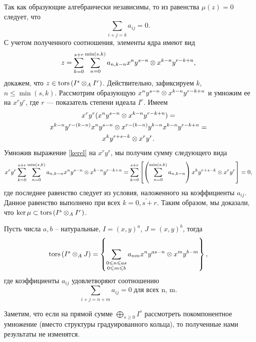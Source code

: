 \begin{Proof}
        Так как образующие алгебраически независимы, то из равенства $\mu(z) = 0$ следует, что
        \begin{equation*}
            \sum_{i + j = k} a_{ij} = 0.
        \end{equation*}
        С учетом полученного соотношения, элементы ядра имеют вид
        \begin{equation} \label{kerel}
            z = \sum_{k=0}^{s + r} \sum_{n = 0}^{\min(s, k)} a_{n,k-n}x^ny^{s - n} \otimes x^{k - n}y^{r - k + n},
        \end{equation}
        докажем, что $z \in \textup{tors}\left(I^s \otimes_A I^r\right)$. Действительно, зафиксируем $k$, $n \leq \min(s, k)$.
        Рассмотрим образующую $x^ny^{s - n} \otimes x^{k - n}y^{r - k + n}$ и умножим ее на 
        $x^ry^r$, где $r$ --- показатель степени идеала $I^r$. Имеем
        \begin{multline*}
            x^ry^r(x^ny^{s - n} \otimes x^{k - n}y^{r - k + n}) = \\
            x^{k - n}y^{r - (k - n)}x^ny^{s - n} \otimes x^{r - (k - n)}y^{k - n}x^{k - n}y^{r - k + n} = \\
            x^ky^{r + s - k} \otimes x^ry^r.
        \end{multline*}
        Умножив выражение \eqref{kerel} на $x^ry^r$,  мы получим сумму следующего вида
        \begin{equation*}
            x^ry^r\sum_{k=0}^{s + r}\sum_{n = 0}^{\min(s, k)} a_{n,k-n}x^ny^{s - n} \otimes x^{k - n}y^{r - k + n} =
            \sum_{k=0}^{s + r} \left[ \left(\sum_{n = 0}^{\min(s, k)}a_{n,k-n}\right)x^ky^{r + s - k} \otimes x^ry^r \right] = 0,
        \end{equation*}
        где последнее равенство следует из условия, наложенного на коэффициенты $a_{ij}$. 
        Данное равенство выполнено при всех $k = \bar{0, s + r}$.
        Таким образом, мы доказали, что $\ker \mu \subset \textup{tors}\left(I^s \otimes_A I^r\right)$.
    \end{Proof}
    \begin{Corollary}
        Пусть числа $a, b$ -- натуральные, $I = (x, y)^a$, $J = (x, y)^b$, тогда
        \begin{equation*}
            \textup{tors}\left(I^s \otimes_A J\right) = 
                \left\{ \sum_{\substack{0 \leqslant n \leqslant as \\ 0 \leqslant m \leqslant b}}a_{nm}x^ny^{as - n} \otimes x^my^{b - m} \right\},
        \end{equation*}
        где коэффициенты $a_{ij}$ удовлетворяют соотношению
        $$\sum_{i + j = n + m} a_{ij} = 0\;\text{для всех n, m}.$$
    \end{Corollary}
    Заметим, что если на прямой сумме $\bigoplus_{s \ge 0} I^s$ рассмотреть покомпонентное умножение
    (вместо структуры градуированного кольца), то полученные нами результаты не изменятся.

